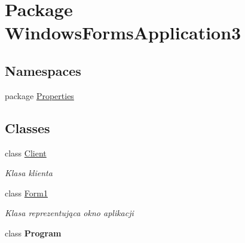 \hypertarget{namespace_windows_forms_application3}{}\section{Package Windows\+Forms\+Application3}
\label{namespace_windows_forms_application3}
\subsection*{Namespaces}
\begin{DoxyCompactItemize}
\item 
package \hyperlink{namespace_windows_forms_application3_1_1_properties}{Properties}
\end{DoxyCompactItemize}
\subsection*{Classes}
\begin{DoxyCompactItemize}
\item 
class \hyperlink{class_windows_forms_application3_1_1_client}{Client}
\begin{DoxyCompactList}\small\item\em Klasa klienta \end{DoxyCompactList}\item 
class \hyperlink{class_windows_forms_application3_1_1_form1}{Form1}
\begin{DoxyCompactList}\small\item\em Klasa reprezentująca okno aplikacji \end{DoxyCompactList}\item 
class {\bfseries Program}
\end{DoxyCompactItemize}
